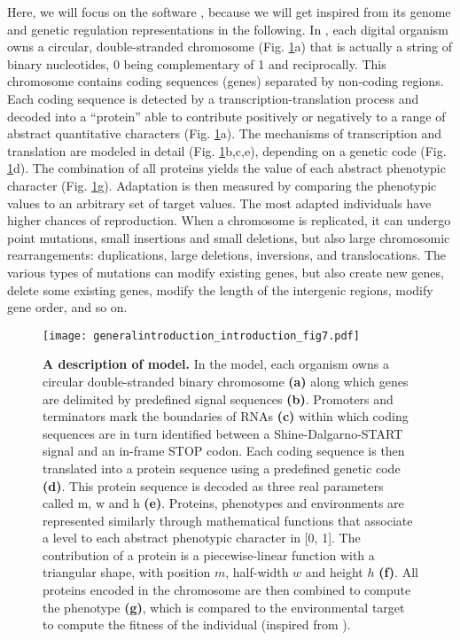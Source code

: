 Here, we will focus on the {\aevol} software \citep{knibbe-et-al-2007a}, because we will get inspired from its genome and genetic regulation representations in the following. In {\aevol}, each digital organism owns a circular, double-stranded chromosome (Fig. \ref{fig:general_introduction:introduction:fig7}a) that is actually a string of binary nucleotides, 0 being complementary of 1 and reciprocally. This chromosome contains coding sequences (genes) separated by non-coding regions. Each coding sequence is detected by a transcription-translation process and decoded into a ``protein'' able to contribute positively or negatively to a range of abstract quantitative characters (Fig. \ref{fig:general_introduction:introduction:fig7}a). The mechanisms of transcription and translation are modeled in detail (Fig. \ref{fig:general_introduction:introduction:fig7}b,c,e), depending on a genetic code (Fig. \ref{fig:general_introduction:introduction:fig7}d). The combination of all proteins yields the value of each abstract phenotypic character (Fig. \ref{fig:general_introduction:introduction:fig7}g). Adaptation is then measured by comparing the phenotypic values to an arbitrary set of target values. The most adapted individuals have higher chances of reproduction. When a chromosome is replicated, it can undergo point mutations, small insertions and small deletions, but also large chromosomic rearrangements: duplications, large deletions, inversions, and translocations. The various types of mutations can modify existing genes, but also create new genes, delete some existing genes, modify the length of the intergenic regions, modify gene order, and so on.

\begin{figure}[!ht]
\centering
\texttt{[image: generalintroduction\_introduction\_fig7.pdf]}
\caption[A description of {\aevol} model.]{{\bf A description of {\aevol} model.}
In the model, each organism owns a circular double-stranded binary chromosome \textbf{(a)} along which genes are delimited by predefined signal sequences \textbf{(b)}. Promoters and terminators mark the boundaries of RNAs \textbf{(c)} within which coding sequences are in turn identified between a Shine-Dalgarno-START signal and an in-frame STOP codon. Each coding sequence is then translated into a protein sequence using a predefined genetic code \textbf{(d)}. This protein sequence is decoded as three real parameters called m, w and h \textbf{(e)}. Proteins, phenotypes and environments are represented similarly through mathematical functions that associate a level to each abstract phenotypic character in [0, 1]. The contribution of a protein is a piecewise-linear function with a triangular shape, with position $m$, half-width $w$ and height $h$ \textbf{(f)}. All proteins encoded in the chromosome are then combined to compute the phenotype \textbf{(g)}, which is compared to the environmental target to compute the fitness of the individual (inspired from \citealt{knibbe-parsons-2014}).}
\label{fig:general_introduction:introduction:fig7}
\end{figure}

